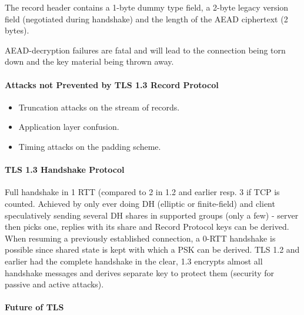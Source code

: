 The record header contains a 1-byte dummy type field, a 2-byte legacy version field (negotiated during handshake) and the length of the AEAD ciphertext (2 bytes).

AEAD-decryption failures are fatal and will lead to the connection being torn down and the key material being thrown away.

\paragraph{Attacks not Prevented by TLS 1.3 Record Protocol}
\begin{itemize}
    \item Truncation attacks on the stream of records.
    \item Application layer confusion.
    \item Timing attacks on the padding scheme.
\end{itemize}

\paragraph{TLS 1.3 Handshake Protocol}
Full handshake in 1 RTT (compared to 2 in 1.2 and earlier resp. 3 if TCP is counted. Achieved by only ever doing DH (elliptic or finite-field) and client speculatively sending several DH shares in supported groups (only a few) - server then picks one, replies with its share and Record Protocol keys can be derived. When resuming a previously established connection, a 0-RTT handshake is possible since shared state is kept with which a PSK can be derived. TLS 1.2 and earlier had the complete handshake in the clear, 1.3 encrypts almost all handshake messages and derives separate key to protect them (security for passive and active attacks).




\paragraph{Future of TLS}




